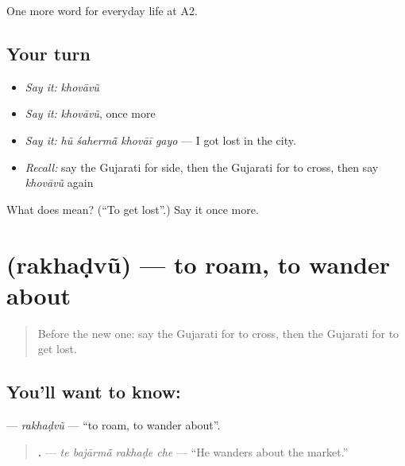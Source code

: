 \begin{grammarlens}[title={What you've built}]
One more word for everyday life at A2.
\end{grammarlens}

\subsection*{Your turn}
\begin{itemize}
\raggedright
  \item \emph{Say it:} \emph{khovāvũ}
  \item \emph{Say it:} \emph{khovāvũ}, once more
  \item \emph{Say it:} \emph{hũ śahermā̃ khovāī gayo} — I got lost in the city.
  \item \emph{Recall:} say the Gujarati for side, then the Gujarati for to cross, then say \emph{khovāvũ} again
\end{itemize}

\begin{tcolorbox}[breakable,colback=teal!4,colframe=teal!35!black,title={Before you move on}]
What does  mean? (\textquotedblleft{}To get lost\textquotedblright{}.) Say it once more.
\end{tcolorbox}
\section[\texorpdfstring{\gu{રખડવું} (rakhaḍvũ)}{રખડવું (rakhaḍvũ)}]{ (rakhaḍvũ) — to roam, to wander about}

\label{lesson:GU-C195-rakhadvu}



\begin{quote}
Before the new one: say the Gujarati for to cross, then the Gujarati for to get lost.
\end{quote}

\subsection*{You'll want to know: }
\textbf{} — \emph{rakhaḍvũ} — \textquotedblleft{}to roam, to wander about\textquotedblright{}.

\begin{quote}
\textbf{   .} — \emph{te bajārmā̃ rakhaḍe che} — \textquotedblleft{}He wanders about the market.\textquotedblright{}
\end{quote}

